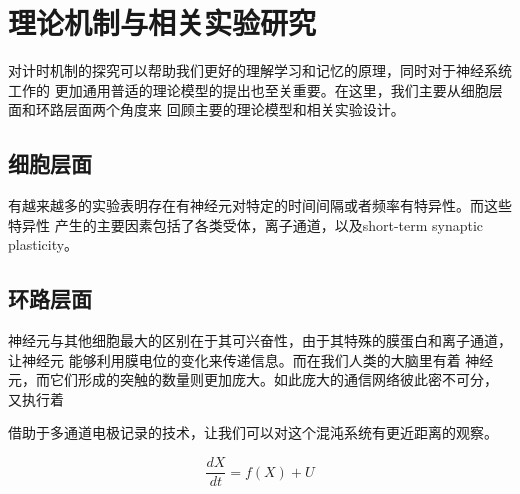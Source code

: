 \section{理论机制与相关实验研究}
对计时机制的探究可以帮助我们更好的理解学习和记忆的原理，同时对于神经系统工作的
更加通用普适的理论模型的提出也至关重要。在这里，我们主要从细胞层面和环路层面两个角度来
回顾主要的理论模型和相关实验设计。

\subsection{细胞层面}
有越来越多的实验表明存在有神经元对特定的时间间隔或者频率有特异性。而这些特异性
产生的主要因素包括了各类受体，离子通道，以及short-term synaptic plasticity。



\subsection{环路层面}
神经元与其他细胞最大的区别在于其可兴奋性，由于其特殊的膜蛋白和离子通道，让神经元
能够利用膜电位的变化来传递信息。而在我们人类的大脑里有着%
神经元，而它们形成的突触的数量则更加庞大。如此庞大的通信网络彼此密不可分，
又执行着%

借助于多通道电极记录的技术，让我们可以对这个混沌系统有更近距离的观察。



$$ \frac{dX}{dt} = f(X) + U $$

